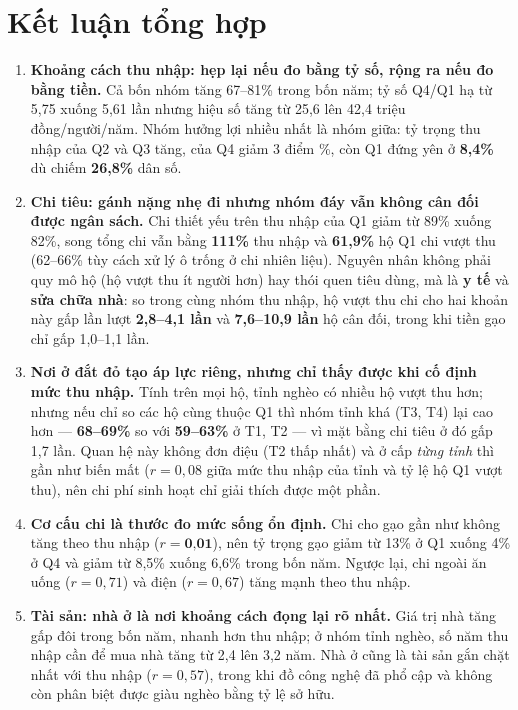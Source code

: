 \documentclass[11pt,a4paper]{article}
\newcommand{\n}[1]{\textbf{#1}}
\begin{document}
\section{Kết luận tổng hợp}

\begin{enumerate}[leftmargin=1.5em,itemsep=6pt,topsep=3pt]
\item \n{Khoảng cách thu nhập: hẹp lại nếu đo bằng tỷ số, rộng ra nếu đo bằng tiền.} Cả bốn nhóm tăng 67–81\% trong bốn năm; tỷ số Q4/Q1 hạ từ 5,75 xuống 5,61 lần nhưng hiệu số tăng từ 25,6 lên 42,4 triệu đồng/người/năm. Nhóm hưởng lợi nhiều nhất là nhóm giữa: tỷ trọng thu nhập của Q2 và Q3 tăng, của Q4 giảm 3 điểm \%, còn Q1 đứng yên ở \n{8,4\%} dù chiếm \n{26,8\%} dân số.

\item \n{Chi tiêu: gánh nặng nhẹ đi nhưng nhóm đáy vẫn không cân đối được ngân sách.} Chi thiết yếu trên thu nhập của Q1 giảm từ 89\% xuống 82\%, song tổng chi vẫn bằng \n{111\%} thu nhập và \n{61,9\%} hộ Q1 chi vượt thu (62–66\% tùy cách xử lý ô trống ở chi nhiên liệu). Nguyên nhân không phải quy mô hộ (hộ vượt thu ít người hơn) hay thói quen tiêu dùng, mà là \n{y tế} và \n{sửa chữa nhà}: so trong cùng nhóm thu nhập, hộ vượt thu chi cho hai khoản này gấp lần lượt \n{2,8–4,1 lần} và \n{7,6–10,9 lần} hộ cân đối, trong khi tiền gạo chỉ gấp 1,0–1,1 lần.

\item \n{Nơi ở đắt đỏ tạo áp lực riêng, nhưng chỉ thấy được khi cố định mức thu nhập.} Tính trên mọi hộ, tỉnh nghèo có nhiều hộ vượt thu hơn; nhưng nếu chỉ so các hộ cùng thuộc Q1 thì nhóm tỉnh khá (T3, T4) lại cao hơn — \n{68–69\%} so với \n{59–63\%} ở T1, T2 — vì mặt bằng chi tiêu ở đó gấp 1,7 lần. Quan hệ này không đơn điệu (T2 thấp nhất) và ở cấp \emph{từng tỉnh} thì gần như biến mất ($r = 0{,}08$ giữa mức thu nhập của tỉnh và tỷ lệ hộ Q1 vượt thu), nên chi phí sinh hoạt chỉ giải thích được một phần.

\item \n{Cơ cấu chi là thước đo mức sống ổn định.} Chi cho gạo gần như không tăng theo thu nhập ($r = \n{0,01}$), nên tỷ trọng gạo giảm từ 13\% ở Q1 xuống 4\% ở Q4 và giảm từ 8,5\% xuống 6,6\% trong bốn năm. Ngược lại, chi ngoài ăn uống ($r = 0,71$) và điện ($r = 0,67$) tăng mạnh theo thu nhập.

\item \n{Tài sản: nhà ở là nơi khoảng cách đọng lại rõ nhất.} Giá trị nhà tăng gấp đôi trong bốn năm, nhanh hơn thu nhập; ở nhóm tỉnh nghèo, số năm thu nhập cần để mua nhà tăng từ 2,4 lên 3,2 năm. Nhà ở cũng là tài sản gắn chặt nhất với thu nhập ($r = 0,57$), trong khi đồ công nghệ đã phổ cập và không còn phân biệt được giàu nghèo bằng tỷ lệ sở hữu.
\end{enumerate}
\end{document}
